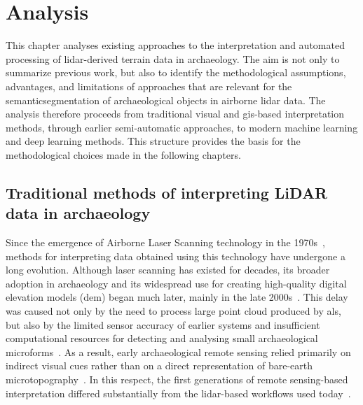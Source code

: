 
\chapter{Analysis}\label{ch:analysis}

This chapter analyses existing approaches to the interpretation and automated processing of \gls{lidar}-derived terrain data in archaeology. The aim is not only to summarize previous work, but also to identify the methodological assumptions, advantages, and limitations of approaches that are relevant for the \gls{semanticsegmentation} of archaeological objects in airborne \gls{lidar} data. The analysis therefore proceeds from traditional visual and \gls{gis}-based interpretation methods, through earlier semi-automatic approaches, to modern machine learning and deep learning methods. This structure provides the basis for the methodological choices made in the following chapters.

\section{Traditional methods of interpreting LiDAR data in archaeology}
Since the emergence of Airborne Laser Scanning technology in the 1970s~\cite{MILIARESIS20071076}, methods for interpreting data obtained using this technology have undergone a long evolution.
Although laser scanning has existed for decades, its broader adoption in archaeology and its widespread use for creating high-quality digital elevation models (\gls{dem}) began much later, mainly in the late 2000s~\cite{HUERTAS1988131,zhang_unveiling_2024}. This delay was caused not only by the need to process large point cloud produced by \gls{als}, but also by the limited sensor accuracy of earlier systems and insufficient computational resources for detecting and analysing small archaeological microforms~\cite{MILIARESIS20071076,michenot_identification_2024}.
As a result, early archaeological remote sensing relied primarily on indirect visual cues rather than on a direct representation of bare-earth microtopography~\cite{HUERTAS1988131,liow_use_1990}. In this respect, the first generations of remote sensing-based interpretation differed substantially from the \gls{lidar}-based workflows used today~\cite{trier_using_2019}.

